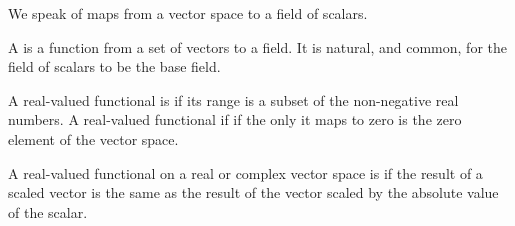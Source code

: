 \sbasic


\sstart



We speak of maps
from a vector space
to a field of scalars.


A
is a function from
a set of vectors to a field.
It is natural, and common,
for the field of scalars
to be the base field.

A real-valued functional is
if its
range is a subset of
the non-negative real
numbers.
A real-valued functional if
if the only it maps to zero is
the zero element of the vector space.

A real-valued functional
on a real or complex
vector space is
if the result of a scaled vector
is the same as the result of the vector
scaled by the absolute value of the scalar.

\strats

